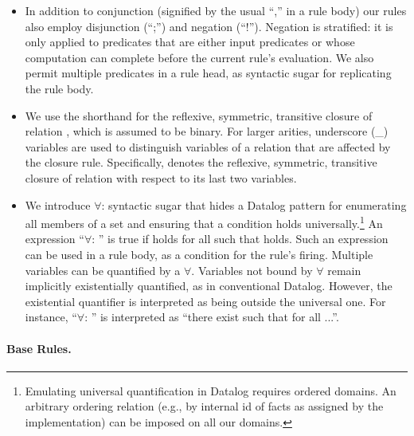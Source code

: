 \begin{itemize}
\item In addition to conjunction (signified by the usual ``,'' in a rule body)
	our rules also employ disjunction (``;'') and negation (``!''). Negation is
	stratified: it is only applied to predicates that are either input
	predicates or whose computation can complete before the current rule's
	evaluation. We also permit multiple predicates in a rule head, as syntactic
	sugar for replicating the rule body.%

\item We use the shorthand  for the reflexive, symmetric,
	transitive closure of relation , which is assumed to be binary.
	For larger arities, underscore (\_) variables are used to distinguish
	variables of a relation that are affected by the closure rule.
	Specifically,  denotes the reflexive,
	symmetric, transitive closure of relation  with respect
	to its last two variables.

\item We introduce $\forall$: syntactic sugar that hides a Datalog pattern for
	enumerating all members of a set and ensuring that a condition holds
	universally.\footnote{Emulating universal quantification in Datalog
	  requires ordered domains. 
    An arbitrary ordering relation (e.g., by internal id of facts as assigned by
	the implementation) can be imposed on all our domains.} An expression
	``$\forall$:  \rightrulearrow{} ''  is
	true if  holds for all  such that  holds.
	Such an expression can be used in a rule body, as a condition for the
	rule's firing. Multiple variables can be quantified by a $\forall$. Variables
	not bound by $\forall$ remain implicitly existentially
	quantified, as in conventional Datalog. However, the existential quantifier
	is interpreted as being outside the universal one. For instance,
	``$\forall$:  \rightrulearrow{}
	'' is interpreted as ``there exist  such that
	for all  ...''.
\end{itemize}



\paragraph{Base Rules.}

